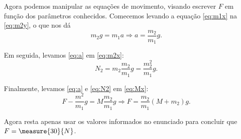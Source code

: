 \begin{question}
\begin{solution}
\begin{enumerate}
			Agora podemos manipular as equações de movimento, visando escrever $F$ em função dos parâmetros conhecidos.
			Comecemos levando a equação \ref{eq:m1x} na \eqref{eq:m2y}, o que nos dá
			\begin{equation}\label{eq:a}
				m_2 g = m_1 a
					\Rightarrow
				a = \frac{m_2}{m_1}g.
			\end{equation}

			Em seguida, levamos \eqref{eq:a} em \eqref{eq:m2x}:
			\begin{equation}\label{eq:N2}
				N_2 = m_2 \frac{m_2}{m_1}g = \frac{m_2^2}{m_1}g.
			\end{equation}

			Finalmente, levamos \eqref{eq:a} e \eqref{eq:N2} em \eqref{eq:Mx}:
			\begin{equation*}
				F - \frac{m^2}{m_1}g = M\frac{m_2}{m_1}g
					\Rightarrow
				F = \frac{m_2}{m_1}\left(M + m_2\right)g.
			\end{equation*}

			Agora resta apenas usar os valores informados no enunciado para concluir que $F = \measure{30}{N}$.

		\end{enumerate}
	\end{solution}
\end{question}